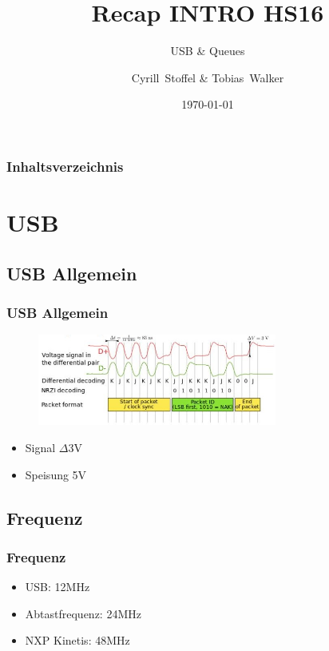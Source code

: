 \documentclass{beamer}
\title{Recap INTRO HS16}
\subtitle{USB \& Queues}
\author[Stoffel, Walker] %
{Cyrill~Stoffel \& Tobias~Walker}
\date{\today}
\begin{document}
	
	\frame{\titlepage}

	
	\begin{frame}
		\frametitle{Inhaltsverzeichnis}
		\tableofcontents
	\end{frame}

	\section{USB}
	\subsection{USB Allgemein}
	\begin{frame}
			\frametitle{USB Allgemein}
				\begin{figure}
					\includegraphics[width=0.7\textwidth]{usb}
				\end{figure}
			\begin{itemize}
				\item Signal $\Delta$3V
				\item Speisung 5V			
			\end{itemize}								
	\end{frame}
	
	\subsection{Frequenz}
	\begin{frame}
		\frametitle{Frequenz}
		\begin{itemize}
			\item USB: 12MHz
			\item Abtastfrequenz: 24MHz
			\item NXP Kinetis: 48MHz
		\end{itemize}
	\end{frame}
\end{document}
